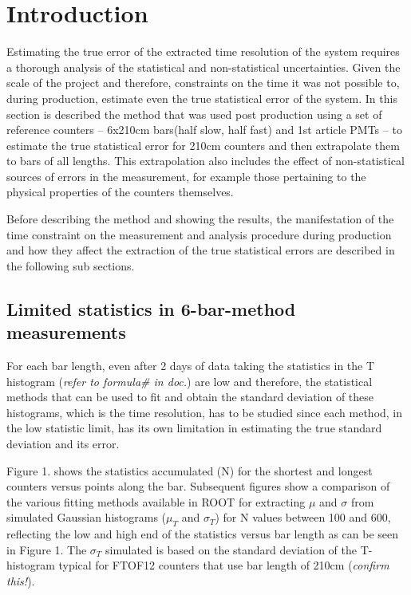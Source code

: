 \documentclass[12pt]{article}
\begin{document}
\maketitle


 
\section{Introduction}

Estimating the true error of the extracted time resolution of the system requires a thorough analysis of the statistical and non-statistical uncertainties. Given the scale of the project and therefore, constraints on the time it was not possible to, during production, estimate even the true statistical error of the system. In this section is described the method that was used post production using a set of reference counters -- 6x210cm bars(half slow, half fast) and 1st article PMTs -- to estimate the true statistical error for 210cm counters and then extrapolate them to bars of all lengths. This extrapolation also includes the effect of non-statistical sources of errors in the measurement, for example those pertaining to the physical properties of the counters themselves. 

Before describing the method and showing the results, the manifestation of the time constraint on the measurement and analysis procedure during production and how they affect the extraction of the true statistical errors are described in the following sub sections.

\subsection{Limited statistics in 6-bar-method measurements}
For each bar length, even after 2 days of data taking the statistics in the T histogram (\textit{refer to formula# in doc.}) are low and therefore, the statistical methods that can be used to fit and obtain the standard deviation of these histograms, which is the time resolution, has to be studied since each method, in the low statistic limit, has its own limitation in estimating the true standard deviation and its error. 

Figure 1. shows the statistics accumulated (N) for the shortest and longest counters versus points along the bar. Subsequent figures show a comparison of the various fitting methods available in ROOT for extracting $\mu$ and $\sigma$ from simulated Gaussian histograms ($\mu_{T}$ and $\sigma_{T}$) for N values between 100 and 600, reflecting the low and high end of the statistics versus bar length as can be seen in Figure 1. The $\sigma_{T}$ simulated is based on the standard deviation of the T-histogram typical for FTOF12 counters that use bar length of 210cm (\textit{confirm this!}).
\end{document}
